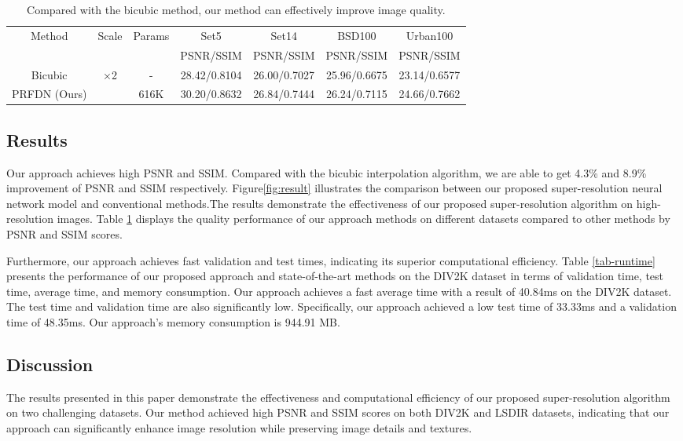 \documentclass[10pt,twocolumn,letterpaper]{article}
\begin{document}
\begin{table}[t]
    \caption{Compared with the bicubic method, our method can effectively improve image quality.}
    \resizebox{\columnwidth}{!}
    {
        \begin{tabular}{|c|c|c|c|c|c|c|}
        \hline
        \multirow{2}{*}{Method} & \multirow{2}{*}{Scale} & \multirow{2}{*}{Params} & Set5  & Set14 & BSD100 & Urban100  \\
    \cline{4-7}          &       &       & PSNR/SSIM & PSNR/SSIM & PSNR/SSIM & PSNR/SSIM  \\
        \hline
        Bicubic & \multirow{2}[2]{*}{×2} & -     & 28.42/0.8104 & 26.00/0.7027 & 25.96/0.6675 & 23.14/0.6577  \\
        PRFDN (Ours) &       & 616K  & 30.20/0.8632 & 26.84/0.7444 & 26.24/0.7115 & 24.66/0.7662 \\
        \hline
        \end{tabular}%
    }
    \label{tab-quality}
\end{table}%
\subsection{Results}
Our approach achieves high PSNR and SSIM. Compared with the bicubic interpolation algorithm, we are able to get 4.3\% and 8.9\% improvement of PSNR and SSIM respectively. Figure\ref{fig:result} illustrates the comparison between our proposed super-resolution neural network model and conventional methods.The results demonstrate the effectiveness of our proposed super-resolution algorithm on high-resolution images. Table \ref{tab-quality} displays the quality performance of our approach methods on different datasets compared to other methods by PSNR and SSIM scores.

Furthermore, our approach achieves fast validation and test times, indicating its superior computational efficiency. Table \ref{tab-runtime} presents the performance of our proposed approach and state-of-the-art methods on the DIV2K dataset in terms of validation time, test time, average time, and memory consumption. Our approach achieves a fast average time with a result of 40.84ms on the DIV2K dataset. The test time and validation time are also significantly low. Specifically, our approach achieved a low test time of 33.33ms and a validation time of 48.35ms. Our approach's memory consumption is 944.91 MB.


\subsection{Discussion}
The results presented in this paper demonstrate the effectiveness and computational efficiency of our proposed super-resolution algorithm on two challenging datasets. Our method achieved high PSNR and SSIM scores on both DIV2K and LSDIR datasets, indicating that our approach can significantly enhance image resolution while preserving image details and textures.
\end{document}
